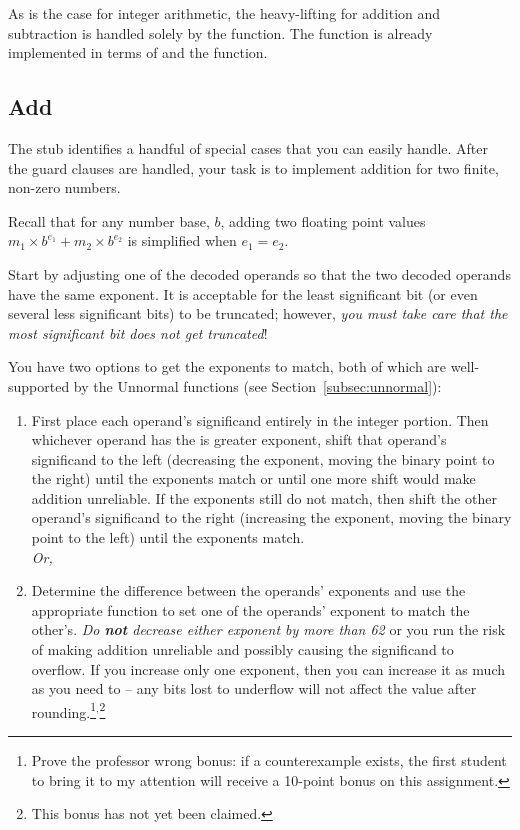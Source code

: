As is the case for integer arithmetic, the heavy-lifting for addition and subtraction is handled solely by the  function.
The  function is already implemented in terms of  and the  function.

\subsection{Add}

The  stub identifies a handful of special cases that you can easily handle.
After the guard clauses are handled, your task is to implement addition for two finite, non-zero numbers.

Recall that for any number base, $b$, adding two floating point values $m_1 \times b^{e_1} + m_2 \times b^{e_2}$ is simplified when $e_1 = e_2$.

Start by adjusting one of the decoded operands so that the two decoded operands have the same exponent.
It is acceptable for the least significant bit (or even several less significant bits) to be truncated;
however, \textit{you must take care that the most significant bit does not get truncated}!

You have two options to get the exponents to match, both of which are well-supported by the Unnormal functions (see Section~\ref{subsec:unnormal}):
\begin{enumerate}
    \item First place each operand's significand entirely in the integer portion.
        Then whichever operand has the is greater exponent, shift that operand's significand to the left (decreasing the exponent, moving the binary point to the right) until the exponents match or until one more shift would make addition unreliable.
        If the exponents still do not match, then shift the other operand's significand to the right (increasing the exponent, moving the binary point to the left) until the exponents match. \\ \textit{Or,}
    \item Determine the difference between the operands' exponents and use the appropriate function to set one of the operands' exponent to match the other's.
        \textit{Do \textbf{not} decrease either exponent by more than 62} or you run the risk of making addition unreliable and possibly causing the significand to overflow.
        If you increase only one exponent, then you can increase it as much as you need to -- any bits lost to underflow will not affect the value after rounding.\footnote{
            Prove the professor wrong bonus: if a counterexample exists, the first student to bring it to my attention will receive a 10-point bonus on this assignment.
        }$^{,}$\footnote{
            This bonus has not yet been claimed.
        }
\end{enumerate}

